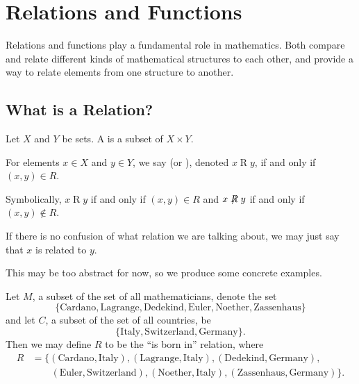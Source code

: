 \chapter{Relations and Functions}
Relations and functions play a fundamental role in mathematics. Both compare and relate different kinds of mathematical structures to each other, and provide a way to relate elements from one structure to another.

\section{What is a Relation?}
\begin{definition}
    Let $X$ and $Y$ be sets. A  is a subset of $X \times Y$.

    For elements $x \in X$ and $y \in Y$, we say  (or ), denoted $x\mathrel{R}y$, if and only if $(x,y) \in R$.
\end{definition}
\begin{remark}
    Symbolically, $x\mathrel{R}y$ if and only if $(x,y)\in R$ and $x\not\mathrel{R}y$ if and only if $(x,y) \notin R$.
\end{remark}
\begin{remark}
    If there is no confusion of what relation we are talking about, we may just say that $x$ is related to $y$.
\end{remark}

This may be too abstract for now, so we produce some concrete examples.
\begin{example}
    Let $M$, a subset of the set of all mathematicians, denote the set
    \[
        \{\text{Cardano}, \text{Lagrange}, \text{Dedekind}, \text{Euler}, \text{Noether}, \text{Zassenhaus}\}
    \]
    and let $C$, a subset of the set of all countries, be
    \[
        \{\text{Italy}, \text{Switzerland}, \text{Germany}\}.
    \]
    Then we may define $R$ to be the ``is born in'' relation, where
    \begin{align*}
        R &= \{(\text{Cardano}, \text{Italy}),(\text{Lagrange}, \text{Italy}),(\text{Dedekind}, \text{Germany}),\\
        &\quad\quad(\text{Euler}, \text{Switzerland}),(\text{Noether}, \text{Italy}),(\text{Zassenhaus}, \text{Germany})\}.
    \end{align*}
\end{example}

